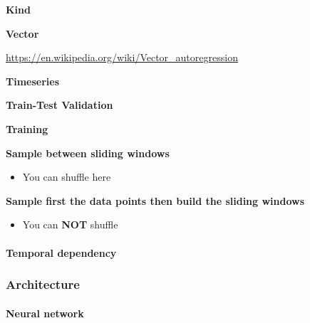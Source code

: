 \documentclass{book}
\providecommand{\ProjectDeepHeading}[2]{%
    \par\medskip\noindent\textbf{#2}\par\smallskip
}
\begin{document}
\ProjectDeepHeading{3}{Kind}

\ProjectDeepHeading{4}{Vector}


\url{https://en.wikipedia.org/wiki/Vector_autoregression}

\ProjectDeepHeading{2}{Timeseries}



\ProjectDeepHeading{5}{Train-Test Validation}

\ProjectDeepHeading{1}{Training}


\ProjectDeepHeading{4}{Sample between sliding windows}
        \begin{itemize}
            \item You can shuffle here
        \end{itemize}
\ProjectDeepHeading{4}{Sample first the data points then build the sliding windows}
    \begin{itemize}
        \item You can \textbf{NOT} shuffle
    \end{itemize}

\paragraph{Temporal dependency}


% 

\subsubsection{Architecture}

\paragraph{Neural network}

\end{document}

